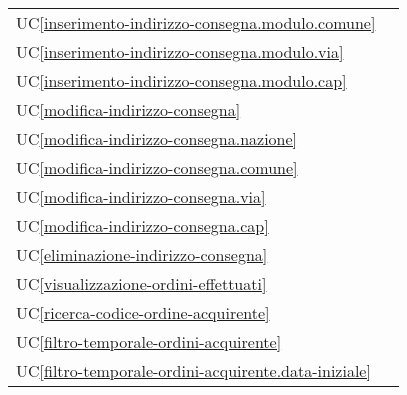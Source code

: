 \begin{longtable}{C{6cm} C{6cm}}
    UC\ref{inserimento-indirizzo-consegna.modulo.comune} &  \\

	UC\ref{inserimento-indirizzo-consegna.modulo.via} &  \\

    UC\ref{inserimento-indirizzo-consegna.modulo.cap} &  \\

	UC\ref{modifica-indirizzo-consegna} &  \\

    UC\ref{modifica-indirizzo-consegna.nazione} &  \\

	UC\ref{modifica-indirizzo-consegna.comune} &  \\

    UC\ref{modifica-indirizzo-consegna.via} &  \\

	UC\ref{modifica-indirizzo-consegna.cap} &  \\

    UC\ref{eliminazione-indirizzo-consegna} &  \\

	UC\ref{visualizzazione-ordini-effettuati} &  \newline {} \\

	UC\ref{ricerca-codice-ordine-acquirente} &  \\

    UC\ref{filtro-temporale-ordini-acquirente} &  \\

	UC\ref{filtro-temporale-ordini-acquirente.data-iniziale} &  \\


\end{longtable}
